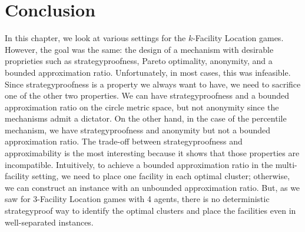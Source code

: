 



\section{Conclusion}

In this chapter, we look at various settings for the $k$-Facility Location games. However, the goal was the same: the design of a mechanism with desirable proprieties such as strategyproofness, Pareto optimality, anonymity, and a bounded approximation ratio. Unfortunately, in most cases, this was infeasible. Since strategyproofness is a property we always want to have, we need to sacrifice one of the other two properties. We can have strategyproofness and a bounded approximation ratio on the circle metric space, but not anonymity since the mechanisms admit a dictator. On the other hand, in the case of the percentile mechanism, we have strategyproofness and anonymity but not a bounded approximation ratio. The trade-off between strategyproofness and approximability is the most interesting because it shows that those properties are incompatible. Intuitively, to achieve a bounded approximation ratio in the multi-facility setting, we need to place one facility in each optimal cluster; otherwise, we can construct an instance with an unbounded approximation ratio. But, as we saw for 3-Facility Location games with 4 agents, there is no deterministic strategyproof way to identify the optimal clusters and place the facilities even in well-separated instances.